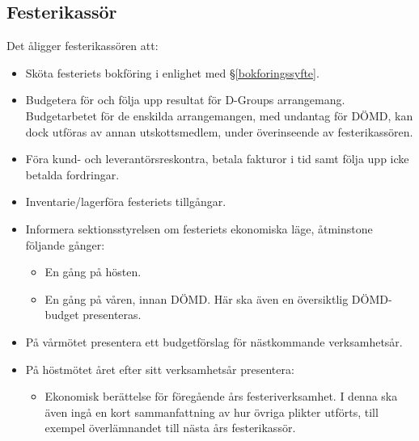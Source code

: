 \documentclass{datateknologsektionen-document}
\begin{document}
\subsection{Festerikassör}
\label{festerikassor}
Det åligger festerikassören att:
\begin{itemize}
  \item Sköta festeriets bokföring i enlighet med \S \ref{bokforingssyfte}.
  \item Budgetera för och följa upp resultat för D-Groups arrangemang. Budgetarbetet för de enskilda arrangemangen, med undantag för DÖMD, kan dock utföras av annan utskottsmedlem, under överinseende av festerikassören.
  \item Föra kund- och leverantörsreskontra, betala fakturor i tid samt följa upp icke betalda fordringar.
  \item Inventarie/lagerföra festeriets tillgångar.
  \item Informera sektionsstyrelsen om festeriets ekonomiska läge, åtminstone följande gånger:
  \begin{itemize}
    \item En gång på hösten.
    \item En gång på våren, innan DÖMD. Här ska även en översiktlig DÖMD-budget presenteras.
  \end{itemize}
  \item På vårmötet presentera ett budgetförslag för nästkommande verksamhetsår.
  \item På höstmötet året efter sitt verksamhetsår presentera:
  \begin{itemize}
    \item Ekonomisk berättelse för föregående års festeriverksamhet. I denna ska även ingå en kort sammanfattning av hur övriga plikter utförts, till exempel överlämnandet till nästa års festerikassör.
  \end{itemize}
\end{itemize}
\end{document}
